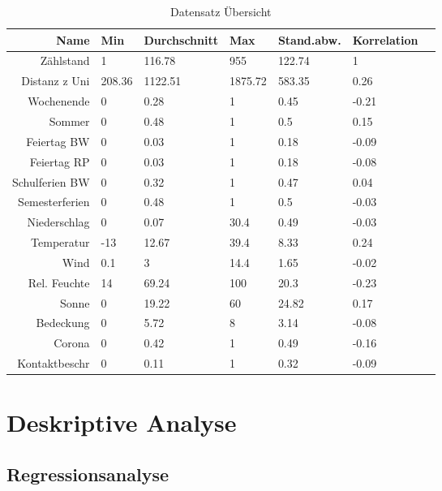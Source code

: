 \documentclass[a4paper,12pt]{thesis}
\begin{document}
\begin{table}[!ht]
	\centering
	\caption{Datensatz Übersicht}
	\begin{tabular}[t]{rllllll}
		\toprule
		Name & Min & Durchschnitt & Max & Stand.abw. & Korrelation \\ 
		\midrule
		Zählstand & 1 & 116.78 & 955 & 122.74 & 1 \\ 
		Distanz z Uni & 208.36 & 1122.51 & 1875.72 & 583.35 & 0.26 \\ 
		Wochenende & 0 & 0.28 & 1 & 0.45 & -0.21 \\ 
		Sommer & 0 & 0.48 & 1 & 0.5 & 0.15 \\ 
		Feiertag BW & 0 & 0.03 & 1 & 0.18 & -0.09 \\ 
		Feiertag RP & 0 & 0.03 & 1 & 0.18 & -0.08 \\ 
		Schulferien BW & 0 & 0.32 & 1 & 0.47 & 0.04 \\ 
		Semesterferien & 0 & 0.48 & 1 & 0.5 & -0.03 \\ 
		Niederschlag & 0 & 0.07 & 30.4 & 0.49 & -0.03 \\ 
		Temperatur & -13 & 12.67 & 39.4 & 8.33 & 0.24 \\ 
		Wind & 0.1 & 3 & 14.4 & 1.65 & -0.02 \\ 
		Rel. Feuchte & 14 & 69.24 & 100 & 20.3 & -0.23 \\ 
		Sonne & 0 & 19.22 & 60 & 24.82 & 0.17 \\ 
		Bedeckung & 0 & 5.72 & 8 & 3.14 & -0.08 \\ 
		Corona & 0 & 0.42 & 1 & 0.49 & -0.16 \\ 
		Kontaktbeschr & 0 & 0.11 & 1 & 0.32 & -0.09 \\ 
		\hline
	\end{tabular}
	\label{Tabelle1}
\end{table}

\chapter{Deskriptive Analyse}

\section{Regressionsanalyse}
\end{document}
